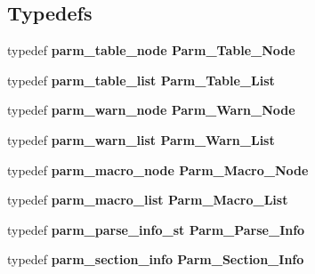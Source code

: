 \subsection*{Typedefs}
\begin{CompactItemize}
\item 
typedef \bf{parm\_\-table\_\-node} \bf{Parm\_\-Table\_\-Node}
\item 
typedef \bf{parm\_\-table\_\-list} \bf{Parm\_\-Table\_\-List}
\item 
typedef \bf{parm\_\-warn\_\-node} \bf{Parm\_\-Warn\_\-Node}
\item 
typedef \bf{parm\_\-warn\_\-list} \bf{Parm\_\-Warn\_\-List}
\item 
typedef \bf{parm\_\-macro\_\-node} \bf{Parm\_\-Macro\_\-Node}
\item 
typedef \bf{parm\_\-macro\_\-list} \bf{Parm\_\-Macro\_\-List}
\item 
typedef \bf{parm\_\-parse\_\-info\_\-st} \bf{Parm\_\-Parse\_\-Info}
\item 
typedef \bf{parm\_\-section\_\-info} \bf{Parm\_\-Section\_\-Info}
\end{CompactItemize}
